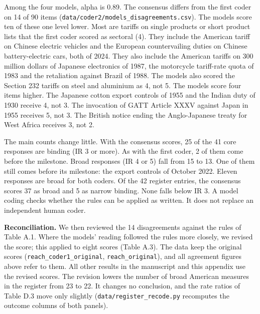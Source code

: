 Among the four models, alpha is 0.89. The consensus differs from the
first coder on 14 of 90 items
(\texttt{data/\allowbreak{}coder2/\allowbreak{}models\_\allowbreak{}disagreements.csv}). The models score ten
of these one level lower. Most are tariffs on single products or short
product lists that the first coder scored as sectoral (4). They include
the American tariff on Chinese electric vehicles and the European
countervailing duties on Chinese battery-electric cars, both of 2024.
They also include the American tariffs on 300 million dollars of
Japanese electronics of 1987, the motorcycle tariff-rate quota of 1983
and the retaliation against Brazil of 1988. The models also scored the
Section 232 tariffs on steel and aluminium as 4, not 5. The models score
four items higher. The Japanese cotton export controls of 1955 and the
Indian duty of 1930 receive 4, not 3. The invocation of GATT Article
XXXV against Japan in 1955 receives 5, not 3. The British notice ending
the Anglo-Japanese treaty for West Africa receives 3, not 2.

The main counts change little. With the consensus scores, 25 of the 41
core responses are binding (IR 3 or more). As with the first coder, 2 of
them come before the milestone. Broad responses (IR 4 or 5) fall from 15
to 13. One of them still comes before its milestone: the export controls
of October 2022. Eleven responses are broad for both coders. Of the 42
register entries, the consensus scores 37 as broad and 5 as narrow
binding. None falls below IR 3. A model coding checks whether the rules
can be applied as written. It does not replace an independent human
coder.

\textbf{Reconciliation.} We then reviewed the 14 disagreements against
the rules of Table A.1. Where the models' reading followed the rules
more closely, we revised the score; this applied to eight scores (Table
A.3). The data keep the original scores
(\texttt{reach\_\allowbreak{}coder1\_\allowbreak{}original}, \texttt{reach\_\allowbreak{}original}), and all
agreement figures above refer to them. All other results in the
manuscript and this appendix use the revised scores. The revision lowers
the number of broad American measures in the register from 23 to 22. It
changes no conclusion, and the rate ratios of Table D.3 move only
slightly (\texttt{data/\allowbreak{}register\_\allowbreak{}recode.py} recomputes the outcome
columns of both panels).

